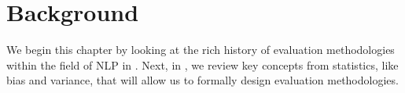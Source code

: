
\chapter{\label{chap:setup} Background}
We begin this chapter by looking at the rich history of evaluation methodologies within the field of NLP in .
Next, in , we review key concepts from statistics, like bias and variance, that will allow us to formally design evaluation methodologies.




